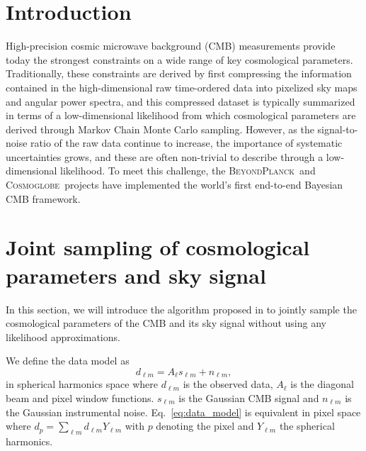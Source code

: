 \documentclass[twocolumn]{../common/aa}
\newcommand{\BP}{\textsc{BeyondPlanck}}
\newcommand{\cosmoglobe}{\textsc{Cosmoglobe}}
\begin{document}

\maketitle

\tableofcontents




\section{Introduction}
\label{sec:introduction}

  High-precision cosmic microwave background (CMB) measurements provide today the strongest constraints on a wide range of key cosmological parameters. Traditionally, these constraints are derived by first compressing the information contained in the high-dimensional raw time-ordered data into pixelized sky maps and angular power spectra, and this compressed dataset is typically summarized in terms of a low-dimensional likelihood from which cosmological parameters are derived through Markov Chain Monte Carlo sampling. However, as the signal-to-noise ratio of the raw data continue to increase, the importance of systematic uncertainties grows, and these are often non-trivial to describe through a low-dimensional likelihood. To meet this challenge, the \BP\ and \cosmoglobe\ projects have implemented the world's first end-to-end Bayesian CMB framework.


\section{Joint sampling of cosmological parameters and sky signal}
\label{sec:methods}

In this section, we will introduce the algorithm proposed in \citet{racine:2016} to jointly sample the cosmological parameters of the CMB and its sky signal without using any likelihood approximations.

We define the data model as
\begin{equation}
    \label{eq:data_model}
    d_{\ell m} = A_{\ell} s_{\ell m} + n_{\ell m},
\end{equation}
in spherical harmonics space where $d_{\ell m}$ is the observed data, $A_\ell$ is the diagonal beam and pixel window functions. $s_{\ell m}$ is the Gaussian CMB signal and $n_{\ell m}$ is the Gaussian instrumental noise. Eq.~\eqref{eq:data_model} is equivalent in pixel space where $d_p = \sum_{\ell m} d_{\ell m} Y_{\ell m}$ with $p$ denoting the pixel and $Y_{\ell m}$ the spherical harmonics.
\end{document}
